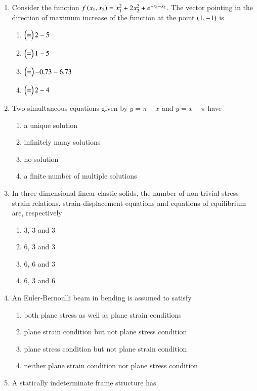 \documentclass[journal]{IEEEtran}
\numberwithin{equation}{enumi}
\numberwithin{figure}{enumi}
\begin{document}
\begin{enumerate}
\item Consider the function $f\left(x_1, x_2\right) = x_1^2 + 2x_2^2 + e^{-x_1 - x_2}$. The vector pointing in the direction of maximum increase of the function at the point $\left(1, -1\right)$ is
	\begin{enumerate}
		\item $\begin{pmatrix}=\end{pmatrix} {2 \\
			-5}$
		\item $\begin{pmatrix}=\end{pmatrix} {1 \\
			-5}$
		\item $\begin{pmatrix}=\end{pmatrix} {-0.73 \\
			-6.73}$
		\item $\begin{pmatrix}=\end{pmatrix} {2 \\
			-4}$
	\end{enumerate}
\item Two simultaneous equations given by $y = \pi + x$ and $y = x - \pi$ have
	\begin{enumerate}
		\item a unique solution
		\item infinitely many solutions
		\item no solution
		\item a finite number of multiple solutions
	\end{enumerate}
\item In three-dimensional linear elastic solids, the number of non-trivial stress-strain relations, strain-displacement equations and equations of equilibrium are, respectively
	\begin{enumerate}
		\item 3, 3 and 3
		\item 6, 3 and 3
		\item 6, 6 and 3
		\item 6, 3 and 6
	\end{enumerate}
\item An Euler-Bernoulli beam in bending is assumed to satisfy
	\begin{enumerate}
		\item both plane stress as well as plane strain conditions
		\item plane strain condition but not plane stress condition
		\item plane stress condition but not plane strain condition
		\item neither plane strain condition nor plane stress condition
	\end{enumerate}
\item A statically indeterminate frame structure has

\end{enumerate}
\end{document}
